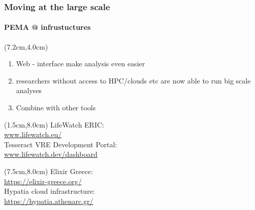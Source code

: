 \documentclass{beamer}
\begin{document}
   \begin{frame}
      \frametitle{Moving at the large scale}
      \framesubtitle{PEMA @ infrustuctures}
      \begin{singlespace}

         \begin{textblock*}{5cm}(7.2cm,4.0cm)
            \begin{enumerate}
               \item \small Web - interface make analysis even easier
               \item \small researchers without access to HPC/clouds etc are now able to run big scale analyses
               \item \small Combine with other tools
            \end{enumerate}
         \end{textblock*}

         \begin{textblock*}{5cm}(1.5cm,8.0cm)
            \tiny LifeWatch ERIC: \\ \href{https://www.lifewatch.eu/}{www.lifewatch.eu/} \\
            \tiny Tesseract VRE Development Portal: \\ \href{https://www.lifewatch.dev/dashboard}{www.lifewatch.dev/dashboard}
   
         \end{textblock*}

         \begin{textblock*}{5cm}(7.5cm,8.0cm)
            \tiny Elixir Greece: \\ \href{https://elixir-greece.org/}{https://elixir-greece.org/} \\
            \tiny Hypatia cloud infrastructure: \\ \href{https://hypatia.athenarc.gr/}{https://hypatia.athenarc.gr/}
   

\end{textblock*}
\end{singlespace}
\end{frame}
\end{document}
